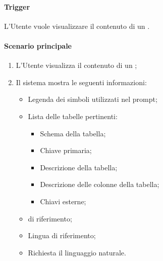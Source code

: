 \paragraph*{Trigger}
L'Utente vuole visualizzare il contenuto di un .

\paragraph*{Scenario principale}
\begin{enumerate}
  \item L'Utente visualizza il contenuto di un ;
  \item Il sistema mostra le seguenti informazioni:
  \begin{itemize}
    \item Legenda dei simboli utilizzati nel prompt;
    \item Lista delle tabelle pertinenti:
    \begin{itemize}
      \item Schema della tabella;
      \item Chiave primaria;
      \item Descrizione della tabella;
      \item Descrizione delle colonne della tabella;
      \item Chiavi esterne;
    \end{itemize}
    \item {} di riferimento;
    \item Lingua di riferimento;
    \item Richiesta il linguaggio naturale.
  \end{itemize}
\end{enumerate}
